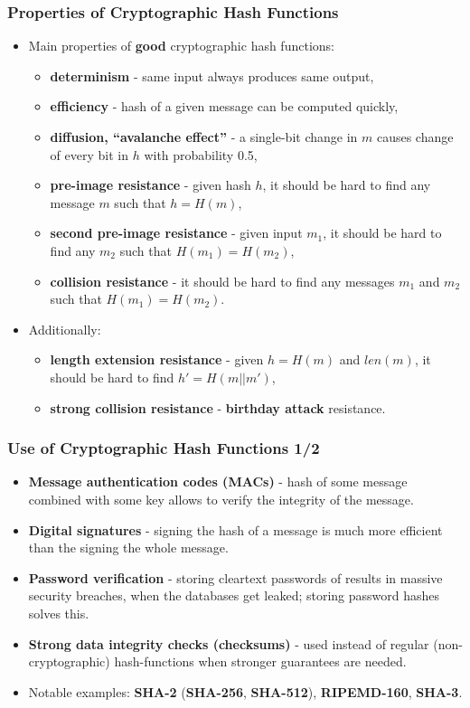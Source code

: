 \documentclass{beamer}
\begin{document}
\begin{frame}
  \frametitle{Properties of Cryptographic Hash Functions}
  \begin{itemize}
  \item Main properties of \textbf{good} cryptographic hash functions:
    \begin{itemize}
    \item \textbf{determinism} - same input always produces same output,
    \item \textbf{efficiency} - hash of a given message can be computed quickly,
    \item \textbf{diffusion, ``avalanche effect''} - a single-bit change in $m$
      causes change of every bit in $h$ with probability 0.5,
    \item \textbf{pre-image resistance} - given hash $h$, it should be hard to
      find any message $m$ such that $h = H(m)$,
    \item \textbf{second pre-image resistance} - given input $m_1$, it should be
      hard to find any $m_2$ such that $H(m_1) = H(m_2)$,
    \item \textbf{collision resistance} - it should be hard to find any messages
      $m_1$ and $m_2$ such that $H(m_1) = H(m_2)$.
    \end{itemize}
  \item Additionally:
    \begin{itemize}
    \item \textbf{length extension resistance} - given $h = H(m)$ and
      $len(m)$, it should be hard to find $h' = H(m || m')$,
    \item \textbf{strong collision resistance} - \textbf{birthday attack}
      resistance.
    \end{itemize}
  \end{itemize}
\end{frame}

\begin{frame}
  \frametitle{Use of Cryptographic Hash Functions 1/2}
  \begin{itemize}
  \item \textbf{Message authentication codes (MACs)} - hash of some message
    combined with some key allows to verify the integrity of the message.
  \item \textbf{Digital signatures} - signing the hash of a message is much
    more efficient than the signing the whole message.
  \item \textbf{Password verification} - storing cleartext passwords of results
    in massive security breaches, when the databases get leaked; storing
    password hashes solves this.
  \item \textbf{Strong data integrity checks (checksums)} - used instead of
    regular (non-cryptographic) hash-functions when stronger guarantees are
    needed.
  \item Notable examples: \textbf{SHA-2} (\textbf{SHA-256}, \textbf{SHA-512}),
    \textbf{RIPEMD-160}, \textbf{SHA-3}.
  \end{itemize}
\end{frame}
\end{document}
